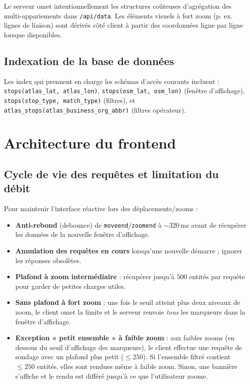 Le serveur omet intentionnellement les structures coûteuses d’agrégation des multi-appariements dans \texttt{/api/data}. Les éléments visuels à fort zoom (p. ex. lignes de liaison) sont dérivés côté client à partir des coordonnées ligne par ligne lorsque disponibles.

\subsection{Indexation de la base de données}
Les index qui prennent en charge les schémas d’accès courants incluent : \verb|stops(atlas_lat, atlas_lon)|, \verb|stops(osm_lat, osm_lon)| (fenêtre d’affichage), \verb|stops(stop_type, match_type)| (filtres), et \verb|atlas_stops(atlas_business_org_abbr)| (filtres opérateur).

\section{Architecture du frontend}
\subsection{Cycle de vie des requêtes et limitation du débit}
Pour maintenir l’interface réactive lors des déplacements/zooms :
\begin{itemize}
  \item \textbf{Anti-rebond} (debounce) de \verb|moveend|/\verb|zoomend| à \(\sim320\,\mathrm{ms}\) avant de récupérer les données de la nouvelle fenêtre d’affichage.
  \item \textbf{Annulation des requêtes en cours} lorsqu’une nouvelle démarre ; ignorer les réponses obsolètes.
  \item \textbf{Plafond à zoom intermédiaire} : récupérer jusqu’à \(500\) entités par requête pour garder de petites charges utiles.
  \item \textbf{Sans plafond à fort zoom} : une fois le seuil atteint plus deux niveaux de zoom, le client omet la limite et le serveur renvoie \emph{tous} les marqueurs dans la fenêtre d’affichage.
  \item \textbf{Exception « petit ensemble » à faible zoom} : aux faibles zooms (en dessous du seuil d’affichage des marqueurs), le client effectue une requête de sondage avec un plafond plus petit (\(\leq250\)). Si l’ensemble filtré contient \(\leq250\) entités, elles sont rendues même à faible zoom. Sinon, une bannière s’affiche et le rendu est différé jusqu’à ce que l’utilisateur zoome.
\end{itemize}

